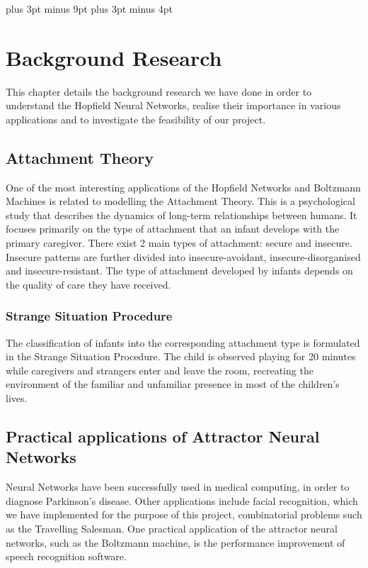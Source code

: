 \belowdisplayskip=12pt plus 3pt minus 9pt
\belowdisplayshortskip=7pt plus 3pt minus 4pt

\chapter{Background Research}
This chapter details the background research we have done in order to understand the Hopfield Neural Networks, realise their importance in various applications and to investigate the feasibility of our project.

\section{Attachment Theory}

One of the most interesting applications of the Hopfield Networks and Boltzmann Machines is related to modelling the Attachment Theory. This is a psychological study that describes the dynamics of long-term relationships between humans\cite{website:attachment_theory_wiki}. It focuses primarily on the type of attachment that an infant develops with the primary caregiver. There exist 2 main types of attachment: secure and insecure. Insecure patterns are further divided into insecure-avoidant, insecure-disorganised and insecure-resistant. The type of attachment developed by infants depends on the quality of care they have received\cite{website:attachment_theory_wiki}.

\subsection{Strange Situation Procedure}

The classification of infants into the corresponding attachment type is formulated in the Strange Situation Procedure. The child is observed playing for 20 minutes while caregivers and strangers enter and leave the room, recreating the environment of the familiar and unfamiliar presence in most of the children's lives.\cite{website:attachment_patterns_wiki}

\section{Practical applications of Attractor Neural Networks}

Neural Networks have been successfully used in medical computing, in order to diagnose Parkinson's disease\cite{nets_parkinsons}. Other applications include facial recognition, which we have implemented for the purpose of this project, combinatorial problems such as the Travelling Salesman\cite{hopfield_laferriere}.
One practical application of the attractor neural networks, such as the Boltzmann machine, is the performance improvement of speech recognition software\cite{speech_nets}.


